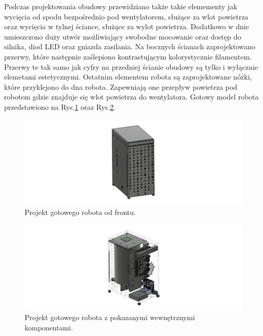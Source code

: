 Podczas projektowania obudowy przewidziano także takie elemementy jak wycięcia od spodu bezpośrednio pod wentylatorem, służące za wlot powietrza 
oraz wycięcia w tylnej ściance, służące za wylot powietrza. Dodatkowo w dnie umieszczono duży utwór możliwiający swobodne mocowanie oraz dostęp do 
silnika, diod LED oraz gniazda zasilania. Na bocznych ścianach zaprojektowano przerwy, które następnie zaślepiono kontrastującym kolorystycznie filamentem.
Przerwy te tak samo jak cyfry na przedniej ścianie obudowy są tylko i wyłącznie elemetami estetycznymi. Ostatnim elementem robota są zaprojektowane nóżki, 
które przyklejono do dna robota. Zapewniają one przepływ powietrza pod robotem gdzie znajduje się wlot powietrza do wentylatora. Gotowy model robota przedstawiono
na Rys.\ref{fig:gotowy} oraz Rys.\ref{fig:srodek}.

\begin{figure}[H]
    \centering
    \includegraphics[width=0.95\linewidth]{chapters/03-praca-wlasna/figures/gotowy2.png}
    \caption{\label{fig:gotowy}Projekt gotowego robota od frontu.}
\end{figure}

\begin{figure}[H]
    \centering
    \includegraphics[width=0.95\linewidth]{chapters/03-praca-wlasna/figures/gotowy w srodku.png}
    \caption{\label{fig:srodek}Projekt gotowego robota z pokazanymi wewnętrznymi komponentami.}
\end{figure}